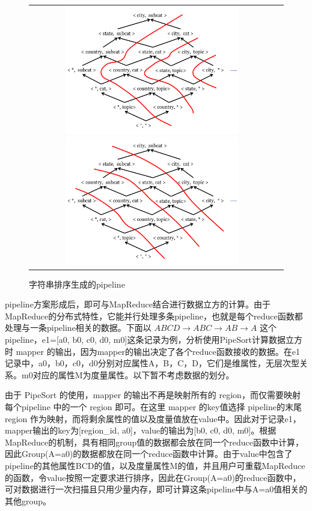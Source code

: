 \begin{figure}[!htb]
\begin{tabular}{cc}

\begin{minipage}[t]{0.5\textwidth}
\centering\includegraphics[width=3in]{picture/ch_terasort_mr/greedy_pipeline} 
\caption{随机贪心生成的pipeline}\label{greedy_pipeline} 
\end{minipage}

\begin{minipage}[t]{0.5\textwidth}
\centering\includegraphics[width=3in]{picture/ch_terasort_mr/sort_pipeline} 
\caption{字符串排序生成的pipeline}\label{sort_pipeline} 
\end{minipage}

\end{tabular}
\end{figure}

pipeline方案形成后，即可与MapReduce结合进行数据立方的计算。由于MapReduce的分布式特性，它能并行处理多条pipeline，也就是每个reduce函数都处理与一条pipeline相关的数据。下面以 $ABCD\rightarrow ABC\rightarrow AB\rightarrow A$ 这个pipeline，e1=[a0, b0, c0, d0, m0]这条记录为例，分析使用PipeSort计算数据立方时 mapper 的输出，因为mapper的输出决定了各个reduce函数接收的数据。在e1 记录中，a0，b0，c0，d0分别对应属性A，B，C，D，它们是维属性，无层次型关系。m0对应的属性M为度量属性。以下暂不考虑数据的划分。

由于 PipeSort 的使用，mapper 的输出不再是映射所有的 region，而仅需要映射 每个pipeline 中的一个 region 即可。在这里 mapper 的key值选择 pipeline的末尾region 作为映射，而将剩余属性的值以及度量值放在value中。因此对于记录e1，mapper输出的key为[region\_id, a0]，value的输出为[b0, c0, d0, m0]。根据MapReduce的机制，具有相同group值的数据都会放在同一个reduce函数中计算，因此Group(A=a0)的数据都放在同一个reduce函数中计算。由于value中包含了pipeline的其他属性BCD的值，以及度量属性M的值，并且用户可重载MapReduce的函数，令value按照一定要求进行排序，因此在Group(A=a0)的reduce函数中，可对数据进行一次扫描且只用少量内存，即可计算这条pipeline中与A=a0值相关的其他group。


